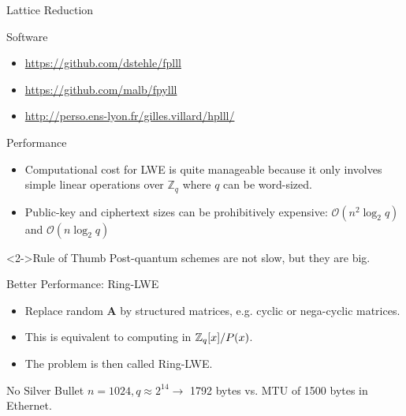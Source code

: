 \documentclass[presentation,smaller]{beamer}
\newcommand{\ZZ}[1][blank]{\ensuremath{\ifthenelse{\equal{#1}{blank}}{\mathbb{Z}}{\mathbb{Z}\left[#1\right]}\xspace}}
\renewcommand{\vec}[1]{\ensuremath{\mathbf{#1}}\xspace}
\begin{document}
\begin{frame}[label={sec:org4d28eb8}]{Lattice Reduction}
\begin{block}{Software}
\begin{itemize}
\item \url{https://github.com/dstehle/fplll}
\item \url{https://github.com/malb/fpylll}
\item \url{http://perso.ens-lyon.fr/gilles.villard/hplll/}
\end{itemize}
\end{block}
\end{frame}


\begin{frame}[label={sec:org0a34fc6}]{Performance}
\begin{itemize}
\item \alert{Computational} cost for LWE is quite manageable because it only involves simple linear operations over \(\mathbb{Z}_q\) where \(q\) can be word-sized.
\item Public-key and ciphertext \alert{sizes} can be prohibitively expensive: \(\mathcal{O}(n^2 \log_2 q)\) and \(\mathcal{O}(n \log_2 q)\)
\end{itemize}

\begin{block}<2->{Rule of Thumb}
Post-quantum schemes are not slow, but they are big.
\end{block}
\end{frame}

\begin{frame}[label={sec:orgf16b4b0}]{Better Performance: Ring-LWE}
\begin{itemize}
\item Replace random \(\vec{A}\) by structured matrices, e.g. cyclic or nega-cyclic matrices.
\item This is equivalent to computing in \(\ZZ_q[x]/P(x)\).
\item The problem is then called \alert{Ring-LWE}.
\end{itemize}

\pause

\begin{block}{No Silver Bullet}
\(n=1024, q≈ 2^{14} →\) 1792 bytes vs. MTU of 1500 bytes in Ethernet.
\end{block}
\end{frame}
\end{document}
